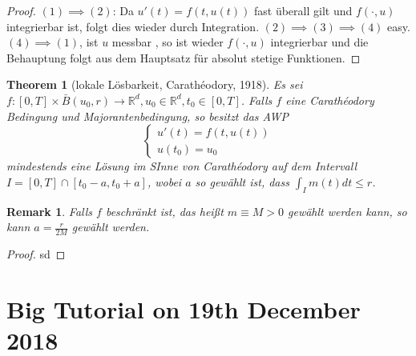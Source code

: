 \documentclass[a4paper, 11pt]{article}
\newtheorem{theorem}{Theorem}
\newtheorem*{remark}{Remark}
\begin{document}
\begin{proof}
	$(1) \implies (2)$: Da $u'(t) = f(t,u(t))$ fast überall gilt und $f(\cdot,u)$ integrierbar ist, folgt dies wieder durch Integration. $(2) \implies (3) \implies (4)$ easy. $(4) \implies (1)$, ist $u$ messbar , so ist wieder $f(\cdot, u)$ integrierbar und die Behauptung folgt aus dem Hauptsatz für absolut stetige Funktionen.
\end{proof}

\begin{theorem}[lokale Lösbarkeit, Carathéodory, 1918]
	Es sei $f: [0,T] \times \bar B(u_0,r) \to \mathbb R^d, u_0 \in \mathbb R^d, t_0 \in [0,T]$. Falls $f$ eine Carathéodory Bedingung und Majorantenbedingung, so besitzt das AWP
	\[
	\begin{cases}
	u'(t) = f(t,u(t)) \\ u(t_0) = u_0
	\end{cases}
	\]
	mindestends eine Lösung im SInne von Carathéodory auf dem Intervall $I = [0,T] \cap [t_0 - a, t_0 + a]$, wobei $a$ so gewählt ist, dass $\int_I m(t)dt \leq r$.
\end{theorem}

\begin{remark}
	Falls $f$ beschränkt ist, das heißt $m \equiv M > 0$ gewählt werden kann, so kann $a= \frac{r}{2M}$ gewählt werden.
\end{remark}

\begin{proof}
	sd
\end{proof}

\section{Big Tutorial on 19th December 2018}
\end{document}
